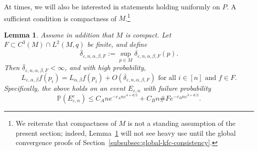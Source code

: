\documentclass{article}
\newtheorem{lemma}[theorem]{Lemma}
\theoremstyle{remark}
\theoremstyle{plain}
\begin{document}
At times, we will also be interested in statements holding uniformly on \( P \). A sufficient condition is compactness of \( M \).\footnote{We reiterate that compactness of \( M \) is not a standing assumption of the present section; indeed, Lemma~\ref{lemma:uniformizing-in-i-with-compactness} will not see heavy use until the global convergence proofs of Section~\ref{subsubsec:global-kfc-consistency}. }
\begin{lemma}
Assume in addition that $M$ is compact. Let $F \subset C^{3}(M) \cap L^{2}(M,q)$ be finite, and define
\begin{equation}
\overline{\delta}_{\varepsilon, n, \alpha, \beta, F}:=\sup_{p \in M}\delta_{\varepsilon,n,\alpha, \beta, F}(p).
\end{equation}
Then $\overline{\delta}_{\varepsilon, n, \alpha, \beta ,F}<\infty$, and with high probability,
\begin{equation}
L_{\varepsilon, \alpha, \beta}f(p_{i}) = L_{\alpha, \beta}f(p_{i})+O(\overline{\delta}_{\varepsilon, n, \alpha, \beta, F}) \text{ for all }i \in [n] \text{ and }f \in F.
\end{equation}
Specifically, the above holds on an event $E_{\varepsilon, n}$ with failure probability
\begin{equation}
\mathbb{P}(E_{\varepsilon, n}^{c}) \leq C_{A} n e^{-c_{A}n \varepsilon^{4+d/2} }+C_{B} n \# F e^{-c_{B}n\varepsilon^{3+d/2}}.
\end{equation}
\label{lemma:uniformizing-in-i-with-compactness}
\end{lemma}
\end{document}
